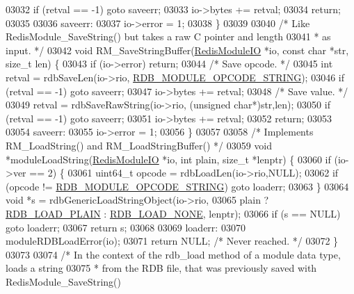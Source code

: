 \begin{DoxyCode}
{{{{{03032     \textcolor{keywordflow}{if} (retval == -1) \textcolor{keywordflow}{goto} saveerr;
03033     io->bytes += retval;
03034     \textcolor{keywordflow}{return};
03035 
03036 saveerr:
03037     io->error = 1;
03038 \}
03039 
03040 \textcolor{comment}{/* Like RedisModule\_SaveString() but takes a raw C pointer and length}
03041 \textcolor{comment}{ * as input. */}
03042 \textcolor{keywordtype}{void} RM\_SaveStringBuffer(\hyperlink{structRedisModuleIO}{RedisModuleIO} *io, \textcolor{keyword}{const} \textcolor{keywordtype}{char} *str, size\_t len) \{
03043     \textcolor{keywordflow}{if} (io->error) \textcolor{keywordflow}{return};
03044     \textcolor{comment}{/* Save opcode. */}
03045     \textcolor{keywordtype}{int} retval = rdbSaveLen(io->rio, \hyperlink{rdb_8h_aba61dd3092856fb28a71a7e0032d82f1}{RDB\_MODULE\_OPCODE\_STRING});
03046     \textcolor{keywordflow}{if} (retval == -1) \textcolor{keywordflow}{goto} saveerr;
03047     io->bytes += retval;
03048     \textcolor{comment}{/* Save value. */}
03049     retval = rdbSaveRawString(io->rio, (\textcolor{keywordtype}{unsigned} \textcolor{keywordtype}{char}*)str,len);
03050     \textcolor{keywordflow}{if} (retval == -1) \textcolor{keywordflow}{goto} saveerr;
03051     io->bytes += retval;
03052     \textcolor{keywordflow}{return};
03053 
03054 saveerr:
03055     io->error = 1;
03056 \}
03057 
03058 \textcolor{comment}{/* Implements RM\_LoadString() and RM\_LoadStringBuffer() */}
03059 \textcolor{keywordtype}{void} *moduleLoadString(\hyperlink{structRedisModuleIO}{RedisModuleIO} *io, \textcolor{keywordtype}{int} plain, size\_t *lenptr) \{
03060     \textcolor{keywordflow}{if} (io->ver == 2) \{
03061         uint64\_t opcode = rdbLoadLen(io->rio,NULL);
03062         \textcolor{keywordflow}{if} (opcode != \hyperlink{rdb_8h_aba61dd3092856fb28a71a7e0032d82f1}{RDB\_MODULE\_OPCODE\_STRING}) \textcolor{keywordflow}{goto} loaderr;
03063     \}
03064     \textcolor{keywordtype}{void} *s = rdbGenericLoadStringObject(io->rio,
03065               plain ? \hyperlink{rdb_8h_a5579c0ff24afa891ad41006def040a25}{RDB\_LOAD\_PLAIN} : \hyperlink{rdb_8h_aa6539176570d3833856d0b6c71077c67}{RDB\_LOAD\_NONE}, lenptr);
03066     \textcolor{keywordflow}{if} (s == NULL) \textcolor{keywordflow}{goto} loaderr;
03067     \textcolor{keywordflow}{return} s;
03068 
03069 loaderr:
03070     moduleRDBLoadError(io);
03071     \textcolor{keywordflow}{return} NULL; \textcolor{comment}{/* Never reached. */}
03072 \}
03073 
03074 \textcolor{comment}{/* In the context of the rdb\_load method of a module data type, loads a string}
03075 \textcolor{comment}{ * from the RDB file, that was previously saved with RedisModule\_SaveString()}
}}}}}
\end{DoxyCode}
